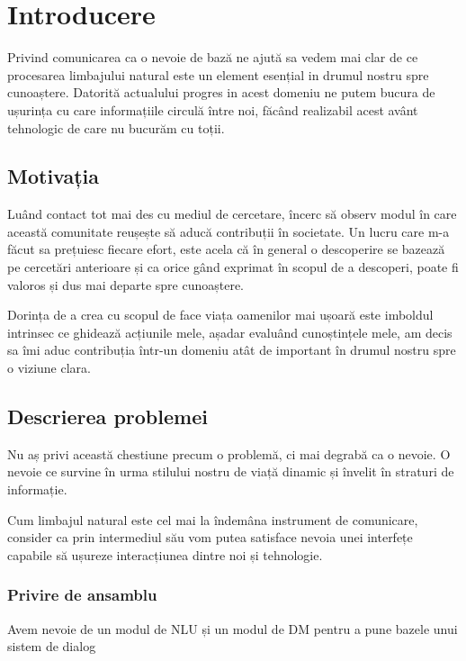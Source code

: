 \chapter{Introducere}

Privind comunicarea ca o nevoie de bază ne ajută sa vedem mai clar de ce procesarea limbajului natural este un element esențial in drumul nostru spre cunoaștere. Datorită actualului progres in acest domeniu ne putem bucura de ușurința cu care informațiile circulă între noi, făcând realizabil acest avânt tehnologic de care nu bucurăm cu toții.

\section{Motivația}

Luând contact tot mai des cu mediul de cercetare, încerc să observ modul în care această comunitate reușește să aducă contribuții în societate. Un lucru care m-a făcut sa prețuiesc fiecare efort, este acela că în general o descoperire se bazează pe cercetări anterioare și ca orice gând exprimat în scopul de a descoperi, poate fi valoros și dus mai departe spre cunoaștere.

Dorința de a crea cu scopul de face viața oamenilor mai ușoară este imboldul intrinsec ce ghidează acțiunile mele, așadar evaluând cunoștințele mele, am decis sa îmi aduc contribuția într-un domeniu atât de important în drumul nostru spre o viziune clara.

\section{Descrierea problemei}

Nu aș privi această chestiune precum o problemă, ci mai degrabă ca o nevoie. O nevoie ce survine în urma stilului nostru de viață dinamic și învelit în straturi de informație.

Cum limbajul natural este cel mai la îndemâna instrument de comunicare, consider ca prin intermediul său vom putea satisface nevoia unei interfețe capabile să ușureze interacțiunea dintre noi și tehnologie.

\subsection{Privire de ansamblu}

Avem nevoie de un modul de NLU și un modul de DM pentru a pune bazele unui sistem de dialog

